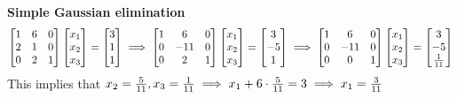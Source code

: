 \documentclass[11pt]{article}
\begin{document}
\noindent\textbf{Simple Gaussian elimination}\\
\[
\begin{bmatrix}
 1 & 6 & 0 \\
 2 & 1 & 0 \\
 0 & 2 & 1
\end{bmatrix}
\begin{bmatrix}
 x_1 \\
 x_2 \\
 x_3
\end{bmatrix} =
\begin{bmatrix}
 3 \\
 1 \\
 1
\end{bmatrix}
\implies
\begin{bmatrix}
 1 & 6 & 0 \\
 0 & -11 & 0 \\
 0 & 2 & 1
\end{bmatrix}
\begin{bmatrix}
 x_1 \\
 x_2 \\
 x_3
\end{bmatrix} =
\begin{bmatrix}
 3 \\
 -5 \\
 1
\end{bmatrix}
\implies
\begin{bmatrix}
 1 & 6 & 0 \\
 0 & -11 & 0 \\
 0 & 0 & 1
\end{bmatrix}
\begin{bmatrix}
 x_1 \\
 x_2 \\
 x_3
\end{bmatrix} =
\begin{bmatrix}
 3 \\
 -5 \\
 1 \over 11 
\end{bmatrix}
\]
This implies that $x_2 = {5 \over 11}, x_3 =  {1 \over 11} \implies
x_1 + 6 \cdot {5 \over 11} = 3 \implies x_1 = {3 \over 11}$
\end{document}
